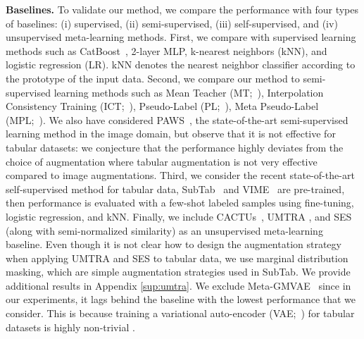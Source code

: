 \textbf{Baselines.}
To validate our method, we compare the performance with four types of baselines: (i) supervised, (ii) semi-supervised, (iii) self-supervised, and (iv) unsupervised meta-learning methods. First, we compare with supervised learning methods such as CatBoost~\citep{prokhorenkova2018catboost}, 2-layer MLP, k-nearest neighbors (kNN), and logistic regression (LR). kNN denotes the nearest neighbor classifier according to the prototype of the input data. Second, we compare our method to semi-supervised learning methods such as Mean Teacher (MT;~\cite{tarvainen2017meanteacher}), Interpolation Consistency Training (ICT;~\cite{verma2019ict}), Pseudo-Label (PL;~\cite{lee2013pseudolabel}), Meta Pseudo-Label (MPL;~\cite{pham2020mpl}). We also have considered PAWS~\citep{assran2021paws}, the state-of-the-art semi-supervised learning method in the image domain, but observe that it is not effective for tabular datasets: we conjecture that the performance highly deviates from the choice of augmentation where tabular augmentation is not very effective compared to image augmentations. Third, we consider the recent state-of-the-art self-supervised method for tabular data, SubTab~\citep{ucar2021subtab} and VIME~\citep{yoon2020vime} are pre-trained, then performance is evaluated with a few-shot labeled samples using fine-tuning, logistic regression, and kNN. Finally, we include CACTUs~\citep{hsu2018cactus}, {UMTRA \citep{khodadadeh2019umtra}, and SES \citep{ye2022revisiting} (along with semi-normalized similarity)} as an unsupervised meta-learning baseline. {Even though it is not clear how to design the augmentation strategy when applying UMTRA and SES to tabular data, we use marginal distribution masking, which are simple augmentation strategies used in SubTab. We provide additional results in Appendix \ref{sup:umtra}.}
We exclude Meta-GMVAE~\citep{lee2021metagmvae} since in our experiments, it lags behind the baseline with the lowest performance that we consider. This is because training a variational auto-encoder (VAE;~\cite{kingma2014auto}) for tabular datasets is highly non-trivial \citep{xu2019modeling}.


